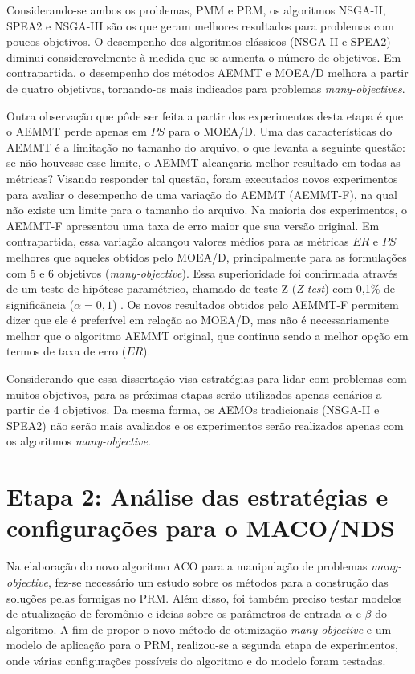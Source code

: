 Considerando-se ambos os problemas, PMM e PRM, os algoritmos NSGA-II, SPEA2 e NSGA-III são os que geram melhores resultados para problemas com poucos objetivos. O desempenho dos algoritmos clássicos (NSGA-II e SPEA2) diminui consideravelmente à medida que se aumenta o número de objetivos. Em contrapartida, o desempenho dos métodos AEMMT e MOEA/D melhora a partir de quatro objetivos, tornando-os mais indicados para problemas \textit{many-objectives}.

Outra observação que pôde ser feita a partir dos experimentos desta etapa é que o AEMMT perde apenas em $PS$ para o MOEA/D. Uma das características do AEMMT é a limitação no tamanho do arquivo, o que levanta a seguinte questão: se não houvesse esse limite, o AEMMT alcançaria melhor resultado em todas as métricas? Visando responder tal questão, foram executados novos experimentos para avaliar o desempenho de uma variação do AEMMT (AEMMT-F), na qual não existe um limite para o tamanho do arquivo. Na maioria dos experimentos, o AEMMT-F apresentou uma taxa de erro maior que sua versão original. Em contrapartida, essa variação alcançou valores médios para as métricas $ER$ e $PS$ melhores que aqueles obtidos pelo MOEA/D, principalmente para as formulações com 5 e 6 objetivos (\textit{many-objective}). Essa superioridade foi confirmada através de um teste de hipótese paramétrico, chamado de teste Z (\textit{Z-test}) com 0,1\% de significância ($\alpha = 0,1$) \cite{Franca2018}. Os novos resultados obtidos pelo AEMMT-F permitem dizer que ele é preferível em relação ao MOEA/D, mas não é necessariamente melhor que o algoritmo AEMMT original, que continua sendo a melhor opção em termos de taxa de erro ($ER$). 

Considerando que essa dissertação visa estratégias para lidar com problemas com muitos objetivos, para as próximas etapas serão utilizados apenas cenários a partir de 4 objetivos. Da mesma forma, os AEMOs tradicionais (NSGA-II e SPEA2) não serão mais avaliados e os experimentos serão realizados apenas com os algoritmos \textit{many-objective}.

\section{Etapa 2: Análise das estratégias e configurações para o MACO/NDS}
\label{section_experimentos_etapa2}

Na elaboração do novo algoritmo ACO para a manipulação de problemas \textit{many-objective}, fez-se necessário um estudo sobre os métodos para a construção das soluções pelas formigas no PRM. Além disso, foi também preciso testar modelos de atualização de feromônio e ideias sobre os parâmetros de entrada $\alpha$ e $\beta$ do algoritmo. A fim de propor o novo método de otimização \textit{many-objective} e um modelo de aplicação para o PRM, realizou-se a segunda etapa de experimentos, onde várias configurações possíveis do algoritmo e do modelo foram testadas.

